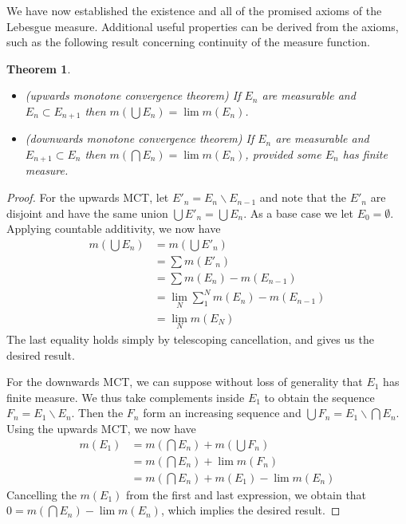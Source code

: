 \documentclass[11pt,oneside]{amsbook}
\renewcommand{\setminus}{\smallsetminus}
\theoremstyle{definition}
\theoremstyle{plain}
\newtheorem{thm}{Theorem}[section]
\theoremstyle{definition}
\theoremstyle{remark}
\numberwithin{equation}{section}
\numberwithin{figure}{section}
\begin{document}
We have now established the existence and all of the promised axioms of the Lebesgue measure. Additional useful properties can be derived from the axioms, such as the following result concerning continuity of the measure function.

\begin{thm}
  \begin{itemize}
  \item (upwards monotone convergence theorem) If $E_n$ are measurable and $E_n\subset E_{n+1}$ then $m(\bigcup E_n)=\lim m(E_n)$.
  \item (downwards monotone convergence theorem) If $E_n$ are measurable and $E_{n+1}\subset E_n$ then $m(\bigcap E_n)=\lim m(E_n)$, provided some $E_n$ has finite measure.
  \end{itemize}
\end{thm}

\begin{proof}
  For the upwards MCT, let $E'_n=E_n\setminus E_{n-1}$ and note that the $E'_n$ are disjoint and have the same union $\bigcup E'_n=\bigcup E_n$. As a base case we let $E_0=\emptyset$. Applying countable additivity, we now have
  \begin{align*}
    m(\bigcup E_n)&=m(\bigcup E'_n)\\
                  &=\sum m(E'_n)\\
                  &=\sum m(E_n)-m(E_{n-1})\\
                  &=\lim_N\sum_1^N m(E_n)-m(E_{n-1})\\
                  &=\lim_N m(E_N)
  \end{align*}
  The last equality holds simply by telescoping cancellation, and gives us the desired result.

  For the downwards MCT, we can suppose without loss of generality that $E_1$ has finite measure. We thus take complements inside $E_1$ to obtain the sequence $F_n=E_1\setminus E_n$. Then the $F_n$ form an increasing sequence and $\bigcup F_n=E_1\setminus\bigcap E_n$. Using the upwards MCT, we now have
  \begin{align*}
    m(E_1)&=m(\bigcap E_n)+m(\bigcup F_n)\\
          &=m(\bigcap E_n)+\lim m(F_n)\\
          &=m(\bigcap E_n)+m(E_1)-\lim m(E_n)
  \end{align*}
  Cancelling the $m(E_1)$ from the first and last expression, we obtain that $0=m(\bigcap E_n)-\lim m(E_n)$, which implies the desired result.
\end{proof}
\end{document}
